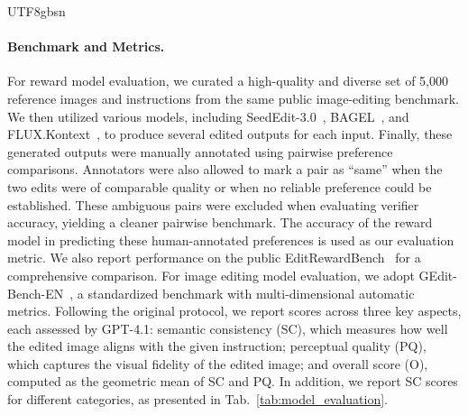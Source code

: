 \documentclass{llmxive}
\providecommand{\editrone}{Edit-R1}
\begin{document}
\begin{CJK*}{UTF8}{gbsn}
\paragraph{Benchmark and Metrics.}
For reward model evaluation, we curated a high-quality and diverse set of 5,000 reference images and instructions from the same public image-editing benchmark. 
We then utilized various models, including SeedEdit-3.0~\citep{wang2025seededit}, BAGEL~\citep{deng2025emerging}, and FLUX.Kontext~\citep{batifol2025flux}, to produce several edited outputs for each input. Finally, these generated outputs were manually annotated using pairwise preference comparisons. 
Annotators were also allowed to mark a pair as ``same'' when the two edits were of comparable quality or when no reliable preference could be established. These ambiguous pairs were excluded when evaluating verifier accuracy, yielding a cleaner pairwise benchmark.
The accuracy of the reward model in predicting these human-annotated preferences is used as our evaluation metric. We also report performance on the public EditRewardBench~\citep{luo2025editscore} for a comprehensive comparison.
For image editing model evaluation, we adopt GEdit-Bench-EN~\citep{liu2025step1x}, a standardized benchmark with multi-dimensional automatic metrics. Following the original protocol, we report scores across three key aspects, each assessed by GPT-4.1: semantic consistency (SC), which measures how well the edited image aligns with the given instruction; perceptual quality (PQ), which captures the visual fidelity of the edited image; and overall score (O), computed as the geometric mean of SC and PQ. In addition, we report SC scores for different categories, as presented in Tab.~\ref{tab:model_evaluation}.




\end{CJK*}
\end{document}
